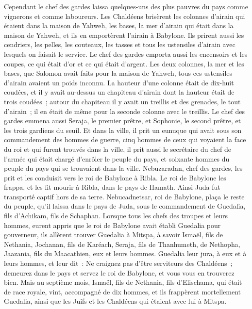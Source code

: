 \begin{multicols}{2}
Cependant le chef des gardes laissa quelques-uns des plus pauvres du pays comme vignerons et comme laboureurs.
Les Chaldéens brisèrent les colonnes d'airain qui étaient dans la maison de Yahweh, les bases, la mer d'airain qui était dans la maison de Yahweh, et ils en emportèrent l'airain à Babylone.
Ils prirent aussi les cendriers, les pelles, les couteaux, les tasses et tous les ustensiles d'airain avec lesquels on faisait le service.
Le chef des gardes emporta aussi les encensoirs et les coupes, ce qui était d'or et ce qui était d'argent.
Les deux colonnes, la mer et les bases, que Salomon avait faits pour la maison de Yahweh, tous ces ustensiles d'airain avaient un poids inconnu.
La hauteur d'une colonne était de dix-huit coudées, et il y avait au-dessus un chapiteau d'airain dont la hauteur était de trois coudées~; autour du chapiteau il y avait un treillis et des grenades, le tout d'airain~; il en était de même pour la seconde colonne avec le treillis.
Le chef des gardes emmena aussi Seraja, le premier prêtre, et Sophonie, le second prêtre, et les trois gardiens du seuil.
Et dans la ville, il prit un eunuque qui avait sous son commandement des hommes de guerre, cinq hommes de ceux qui voyaient la face du roi et qui furent trouvés dans la ville, il prit aussi le secrétaire du chef de l'armée qui était chargé d'enrôler le peuple du pays, et soixante hommes du peuple du pays qui se trouvaient dans la ville.
Nebuzaradan, chef des gardes, les prit et les conduisit vers le roi de Babylone à Ribla.
Le roi de Babylone les frappa, et les fit mourir à Ribla, dans le pays de Hamath. Ainsi Juda fut transporté captif hors de sa terre.
Nebucadnetsar, roi de Babylone, plaça le reste du peuple, qu'il laissa dans le pays de Juda, sous le commandement de Guedalia, fils d'Achikam, fils de Schaphan.
Lorsque tous les chefs des troupes et leurs hommes, eurent appris que le roi de Babylone avait établi Guedalia pour gouverneur, ils allèrent trouver Guedalia à Mitspa, à savoir Ismaël, fils de Nethania, Jochanan, fils de Karéach, Seraja, fils de Thanhumeth, de Nethopha, Jaazania, fils du Maacathien, eux et leurs hommes.
Guedalia leur jura, à eux et à leurs hommes, et leur dit~: Ne craignez pas d'être serviteurs des Chaldéens~; demeurez dans le pays et servez le roi de Babylone, et vous vous en trouverez bien.
Mais au septième mois, Ismaël, fils de Nethania, fils d'Elischama, qui était de race royale, vint, accompagné de dix hommes, et ils frappèrent mortellement Guedalia, ainsi que les Juifs et les Chaldéens qui étaient avec lui à Mitspa.

\end{multicols}
